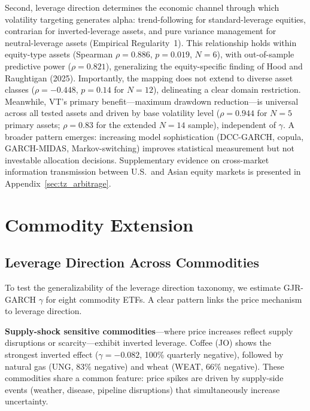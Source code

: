 Second, leverage direction determines the economic channel through which volatility targeting generates alpha: trend-following for standard-leverage equities, contrarian for inverted-leverage assets, and pure variance management for neutral-leverage assets (Empirical Regularity~1). This relationship holds within equity-type assets (Spearman $\rho = 0.886$, $p = 0.019$, $N = 6$), with out-of-sample predictive power ($\rho = 0.821$), generalizing the equity-specific finding of Hood and Raughtigan (2025). Importantly, the mapping does not extend to diverse asset classes ($\rho = -0.448$, $p = 0.14$ for $N = 12$), delineating a clear domain restriction. Meanwhile, VT's primary benefit---maximum drawdown reduction---is universal across all tested assets and driven by base volatility level ($\rho = 0.944$ for $N = 5$ primary assets; $\rho = 0.83$ for the extended $N = 14$ sample), independent of $\gamma$. A broader pattern emerges: increasing model sophistication (DCC-GARCH, copula, GARCH-MIDAS, Markov-switching) improves statistical measurement but not investable allocation decisions. Supplementary evidence on cross-market information transmission between U.S.\ and Asian equity markets is presented in Appendix~\ref{sec:tz_arbitrage}.



\appendix

\section{Commodity Extension}

\subsection{Leverage Direction Across Commodities}

To test the generalizability of the leverage direction taxonomy, we estimate GJR-GARCH $\gamma$ for eight commodity ETFs. A clear pattern links the price mechanism to leverage direction.

\textbf{Supply-shock sensitive commodities}---where price increases reflect supply disruptions or scarcity---exhibit inverted leverage. Coffee (JO) shows the strongest inverted effect ($\gamma = -0.082$, 100\% quarterly negative), followed by natural gas (UNG, 83\% negative) and wheat (WEAT, 66\% negative). These commodities share a common feature: price spikes are driven by supply-side events (weather, disease, pipeline disruptions) that simultaneously increase uncertainty.

